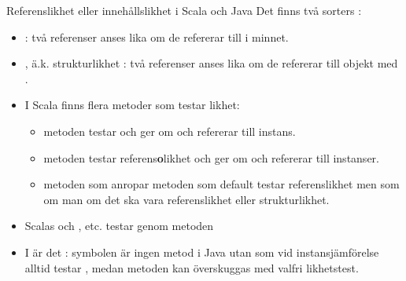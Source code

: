\begin{Slide}{Referenslikhet eller innehållslikhet i Scala och Java}\SlideFontSmall
Det finns två  sorters :
\begin{itemize}
\item {} : två referenser anses lika om de refererar till  i minnet.
\item {}, ä.k. strukturlikhet : två referenser anses lika om de refererar till objekt med .

\pause

\item I Scala finns flera metoder som testar likhet:
\begin{itemize}\SlideFontSmall
\item metoden  testar  och  ger  om  och  refererar till  instans.

\item metoden  testar referens\textbf{o}likhet och  ger  om  och  refererar till  instanser.

\item metoden \code{==} som anropar metoden  som default testar referenslikhet men som  om man  om det ska vara referenslikhet eller strukturlikhet.
\end{itemize}

\pause

\item Scalas  och  ,  etc. testar  genom metoden \code{==}
\pause
\item I  är det : symbolen \code{==} är ingen metod i Java utan  som vid instansjämförelse alltid testar , medan metoden  kan överskuggas med valfri likhetstest.
\end{itemize}
\end{Slide}

